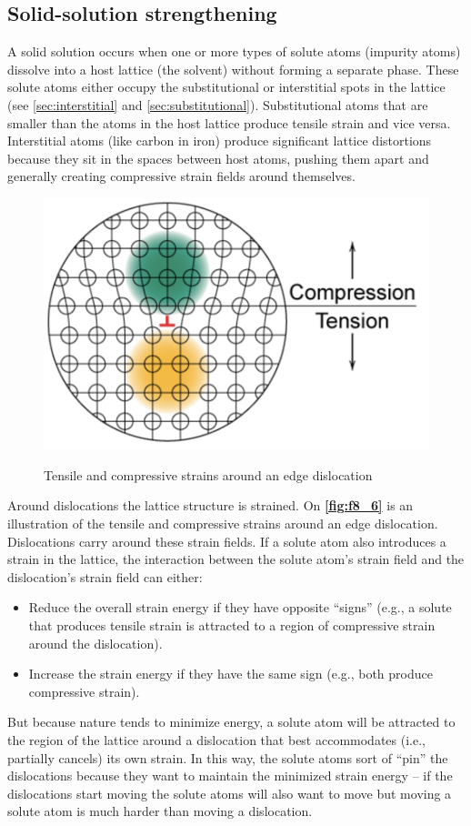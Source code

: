 \subsection{Solid-solution strengthening} \label{sec:sss}
A solid solution occurs when one or more types of solute atoms (impurity atoms) dissolve into a host lattice (the solvent) without forming a separate phase. These solute atoms either occupy the substitutional or interstitial spots in the lattice (see \autoref{sec:interstitial} and \autoref{sec:substitutional}). Substitutional atoms that are smaller than the atoms in the host lattice produce tensile strain and vice versa. Interstitial atoms (like carbon in iron) produce significant lattice distortions because they sit in the spaces between host atoms, pushing them apart and generally creating compressive strain fields around themselves.

\begin{figure} [ht]
  \centering
  \caption{Tensile and compressive strains around an edge dislocation}
  \includegraphics[width=0.5\linewidth]{./figures/f8_6.png}
  \label{fig:f8_6}
\end{figure}

Around dislocations the lattice structure is strained. On \textbf{\autoref{fig:f8_6}} is an illustration of the tensile and compressive strains around an edge dislocation. Dislocations carry around these strain fields. If a solute atom also introduces a strain in the lattice, the interaction between the solute atom’s strain field and the dislocation’s strain field can either:
\begin{itemize}
  \item Reduce the overall strain energy if they have opposite “signs” (e.g., a solute that produces tensile strain is attracted to a region of compressive strain around the dislocation).
  \item Increase the strain energy if they have the same sign (e.g., both produce compressive strain).
\end{itemize}
But because nature tends to minimize energy, a solute atom will be attracted to the region of the lattice around a dislocation that best accommodates (i.e., partially cancels) its own strain. In this way, the solute atoms sort of ``pin'' the dislocations because they want to maintain the minimized strain energy -- if the dislocations start moving the solute atoms will also want to move but moving a solute atom is much harder than moving a dislocation.

